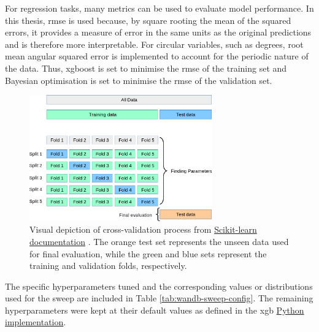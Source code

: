 For regression tasks, many metrics can be used to evaluate model performance. In this thesis, \acrfull{rmse} is used because, by square rooting the mean of the squared errors, it provides a measure of error in the same units as the original predictions and is therefore more interpretable. For circular variables, such as degrees, root mean angular squared error is implemented to account for the periodic nature of the data. Thus, \acrshort{xgboost} is set to minimise the \acrshort{rmse} of the training set and Bayesian optimisation is set to minimise the \acrshort{rmse} of the validation set.

\begin{figure}[h]
    \centering
    \includegraphics[width=0.7\textwidth]{../figures/static/grid_search_cross_validation.png}
    \caption{Visual depiction of cross-validation process from \href{https://scikit-learn.org/stable/modules/cross_validation.html}{Scikit-learn documentation} \citep{Pedregosa2011}. The orange test set represents the unseen data used for final evaluation, while the green and blue sets represent the training and validation folds, respectively.}
    \label{fig:cross_validation_process}
\end{figure}

The specific hyperparameters tuned and the corresponding values or distributions used for the sweep are included in Table \ref{tab:wandb-sweep-config}. The remaining hyperparameters were kept at their default values as defined in the \acrshort{xgb} \href{https://xgboost.readthedocs.io/en/stable/python/python_api.html\#module-xgboost.sklearn}{Python implementation}.

